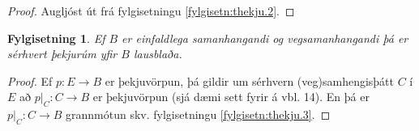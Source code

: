\documentclass[a4paper,icelandic]{book}
\theoremstyle{definition}
\theoremstyle{plain}
\newtheorem{fylgisetn}{Fylgisetning}[section]
\theoremstyle{remark}
\begin{document}
\begin{proof}
  Augljóst út frá fylgisetningu \ref{fylgisetn:thekju.2}.
\end{proof}
\begin{fylgisetn}\label{fylgisetn:thekju.4}
  Ef $B$ er einfaldlega samanhangandi og vegsamanhangandi þá er sérhvert
  þekjurúm yfir $B$ lausblaða.
\end{fylgisetn}
\begin{proof}
  Ef $p:E\to B$ er þekjuvörpun, þá gildir um sérhvern (veg)samhengisþátt
  $C$ í $E$ að $p|_C:C\to B$ er þekjuvörpun (sjá dæmi sett fyrir á vbl.
  14). En þá er $p|_C:C\to B$ grannmótun skv. fylgisetningu
  \ref{fylgisetn:thekju.3}.
\end{proof}




\paragraph{}
\printindex
\end{document}
